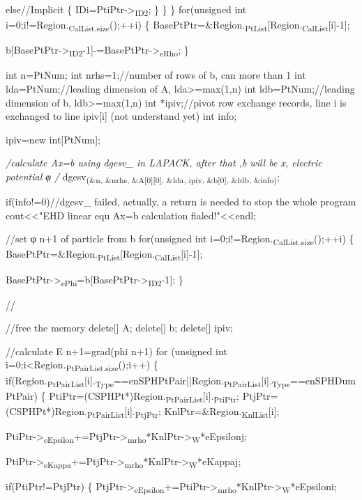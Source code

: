 \documentclass[presentation]{beamer}
\begin{document}
        else//Implicit
          \{
            IDi=PtiPtr->\textsubscript{ID2};
          \}
      \}
  \}
for(unsigned int i=0;i!=Region.\textsubscript{CalList.size}();++i)
  \{
    BasePtPtr=\&Region.\textsubscript{PtList}[Region.\textsubscript{CalList}[i]-1];

  b[BasePtPtr->\textsubscript{ID2}-1]-=BasePtPtr->\textsubscript{eRho};
\}

int n=PtNum;
int nrhs=1;//number of rows of b, can more than 1
int lda=PtNum;//leading dimension of A, lda>=max(1,n)
int ldb=PtNum;//leading dimension of b, ldb>=max(1,n)
int *ipiv;//pivot row exchange records, line i is exchanged to line ipiv[i] (not understand yet)
int info;

ipiv=new int[PtNum];

\emph{/calculate Ax=b using dgesv\_ in LAPACK, after that ,b will be x, electric potential φ
/} dgesv\textsubscript{(\&n, \&nrhs, \&A[0][0], \&lda, ipiv, \&b[0], \&ldb, \&info)};

if(info!=0)//dgesv\_ failed, actually, a return is needed to stop the whole program
  cout<<"EHD linear equ Ax=b calculation fialed!"<<endl;

//set φ n+1 of particle from b
for(unsigned int i=0;i!=Region.\textsubscript{CalList.size}();++i)
  \{
    BasePtPtr=\&Region.\textsubscript{PtList}[Region.\textsubscript{CalList}[i]-1];

  BasePtPtr->\textsubscript{ePhi}=b[BasePtPtr->\textsubscript{ID2}-1];
\}

//


//free the memory
delete[] A;
delete[] b;
delete[] ipiv;

//calculate E n+1=grad(phi n+1)
for (unsigned int i=0;i<Region.\textsubscript{PtPairList.size}();i++)
  \{
    if(Region.\textsubscript{PtPairList}[i].\textsubscript{Type}==enSPHPtPair||Region.\textsubscript{PtPairList}[i].\textsubscript{Type}==enSPHDumPtPair)
     \{
       PtiPtr=(CSPHPt*)Region.\textsubscript{PtPairList}[i].\textsubscript{PtiPtr};
       PtjPtr=(CSPHPt*)Region.\textsubscript{PtPairList}[i].\textsubscript{PtjPtr};
       KnlPtr=\&Region.\textsubscript{KnlList}[i];

PtiPtr->\textsubscript{eEpsilon}+=PtjPtr->\textsubscript{mrho}*KnlPtr->\textsubscript{W}*eEpsilonj;

PtiPtr->\textsubscript{eKappa}+=PtjPtr->\textsubscript{mrho}*KnlPtr->\textsubscript{W}*eKappaj;

if(PtiPtr!=PtjPtr)
    \{
      PtjPtr->\textsubscript{eEpsilon}+=PtiPtr->\textsubscript{mrho}*KnlPtr->\textsubscript{W}*eEpsiloni;
\end{document}
